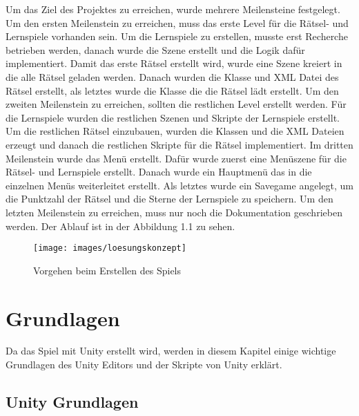 Um das Ziel des Projektes zu erreichen, wurde mehrere Meilensteine festgelegt. Um den ersten Meilenstein zu erreichen, muss das erste Level für die Rätsel- und Lernspiele vorhanden sein. Um die Lernspiele zu erstellen, musste erst Recherche betrieben werden, danach wurde die Szene erstellt und die Logik dafür implementiert. Damit das erste Rätsel erstellt wird, wurde eine Szene kreiert in die alle Rätsel geladen werden. Danach wurden die Klasse und XML Datei des Rätsel erstellt, als letztes wurde die Klasse die die Rätsel lädt erstellt. Um den zweiten Meilenstein zu erreichen, sollten die restlichen Level erstellt werden. Für die Lernspiele wurden die restlichen Szenen und Skripte der Lernspiele erstellt. Um die restlichen Rätsel einzubauen, wurden die Klassen und die XML Dateien erzeugt und danach die restlichen Skripte für die Rätsel implementiert. Im dritten Meilenstein wurde das Menü erstellt. Dafür wurde zuerst eine Menüszene für die Rätsel- und Lernspiele erstellt. Danach wurde ein Hauptmenü das in die einzelnen Menüs weiterleitet erstellt. Als letztes wurde ein Savegame angelegt, um die Punktzahl der Rätsel und die Sterne der Lernspiele zu speichern. Um den letzten Meilenstein zu erreichen, muss nur noch die Dokumentation geschrieben werden. Der Ablauf ist in der Abbildung 1.1 zu sehen.

\begin{figure}[htbp]
  \centering
  \texttt{[image: images/loesungskonzept]}
  \caption{Vorgehen beim Erstellen des Spiels}
  \label{fig:1}
\end{figure}


\chapter{Grundlagen}
\label{cha:grundlagen}

Da das Spiel mit Unity erstellt wird, werden in diesem Kapitel einige wichtige Grundlagen des Unity Editors und der Skripte von Unity erklärt.

\section{Unity Grundlagen}
\label{sec:grundlagenunity}

